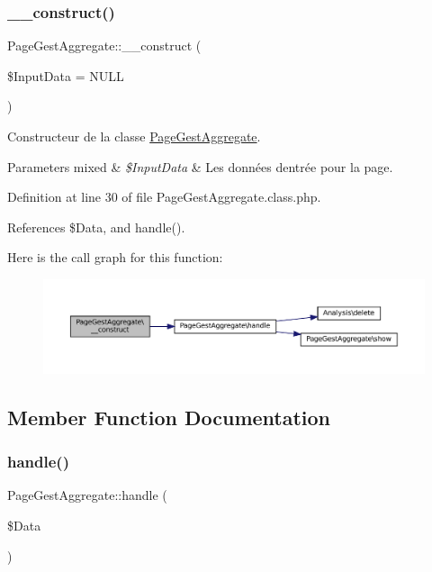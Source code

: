 \subsubsection{\texorpdfstring{\+\_\+\+\_\+construct()}{\_\_construct()}}
{\footnotesize\ttfamily Page\+Gest\+Aggregate\+::\+\_\+\+\_\+construct (\begin{DoxyParamCaption}\item[{}]{\$\+Input\+Data = {\ttfamily NULL} }\end{DoxyParamCaption})}

Constructeur de la classe \hyperlink{class_page_gest_aggregate}{Page\+Gest\+Aggregate}.


\begin{DoxyParams}[1]{Parameters}
mixed & {\em \$\+Input\+Data} & Les données d\textquotesingle{}entrée pour la page. \\
\hline
\end{DoxyParams}


Definition at line 30 of file Page\+Gest\+Aggregate.\+class.\+php.



References \$\+Data, and handle().

Here is the call graph for this function\+:\nopagebreak
\begin{figure}[H]
\begin{center}
\leavevmode
\includegraphics[width=350pt]{class_page_gest_aggregate_ac15507e70d0de1f85e2130d04a9dc331_cgraph}
\end{center}
\end{figure}


\subsection{Member Function Documentation}
\mbox{\label{class_page_gest_aggregate_a9c4a2d111c979d9257b01312b73fd508}} 
\subsubsection{\texorpdfstring{handle()}{handle()}}
{\footnotesize\ttfamily Page\+Gest\+Aggregate\+::handle (\begin{DoxyParamCaption}\item[{}]{\$\+Data }\end{DoxyParamCaption})\hspace{0.3cm}{\ttfamily [protected]}}

